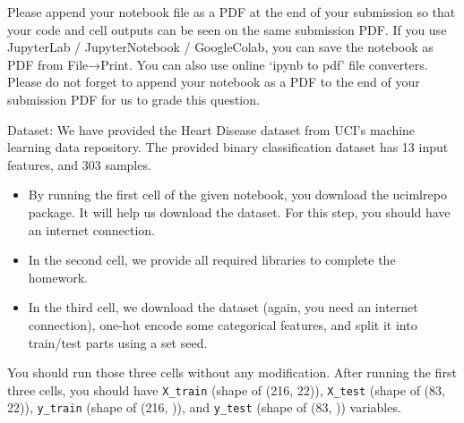 \documentclass[a3paper,12pt]{extarticle} %
\begin{document}
Please append your notebook file as a PDF at the end of your submission so that your code and cell outputs can be seen on the same submission PDF. If you use JupyterLab / JupyterNotebook / GoogleColab, you can save the notebook as PDF from File→Print. You can also use online ‘ipynb to pdf’ file converters. Please do not forget to append your notebook as a PDF to the end of your submission PDF for us to grade this question.

Dataset: We have provided the Heart Disease dataset from UCI’s machine learning data repository. The provided binary classification dataset has 13 input features, and 303 samples.

\begin{itemize}
    \item By running the first cell of the given notebook, you download the ucimlrepo package. It will help us download the dataset. For this step, you should have an internet connection.
    \item In the second cell, we provide all required libraries to complete the homework.
    \item In the third cell, we download the dataset (again, you need an internet connection), one-hot encode some categorical features, and split it into train/test parts using a set seed.
\end{itemize}

You should run those three cells without any modification. After running the first three cells, you should have \texttt{X\_train} (shape of (216, 22)), \texttt{X\_test} (shape of (83, 22)), \texttt{y\_train} (shape of (216, )), and \texttt{y\_test} (shape of (83, )) variables.
\end{document}

